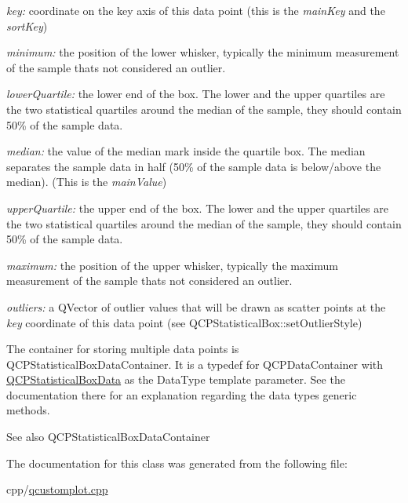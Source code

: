 \begin{DoxyItemize}
\item {\itshape key\+:} coordinate on the key axis of this data point (this is the {\itshape main\+Key} and the {\itshape sort\+Key})\end{DoxyItemize}
\begin{DoxyItemize}
\item {\itshape minimum\+:} the position of the lower whisker, typically the minimum measurement of the sample that\textquotesingle{}s not considered an outlier.\end{DoxyItemize}
\begin{DoxyItemize}
\item {\itshape lower\+Quartile\+:} the lower end of the box. The lower and the upper quartiles are the two statistical quartiles around the median of the sample, they should contain 50\% of the sample data.\end{DoxyItemize}
\begin{DoxyItemize}
\item {\itshape median\+:} the value of the median mark inside the quartile box. The median separates the sample data in half (50\% of the sample data is below/above the median). (This is the {\itshape main\+Value})\end{DoxyItemize}
\begin{DoxyItemize}
\item {\itshape upper\+Quartile\+:} the upper end of the box. The lower and the upper quartiles are the two statistical quartiles around the median of the sample, they should contain 50\% of the sample data.\end{DoxyItemize}
\begin{DoxyItemize}
\item {\itshape maximum\+:} the position of the upper whisker, typically the maximum measurement of the sample that\textquotesingle{}s not considered an outlier.\end{DoxyItemize}
\begin{DoxyItemize}
\item {\itshape outliers\+:} a Q\+Vector of outlier values that will be drawn as scatter points at the {\itshape key} coordinate of this data point (see Q\+C\+P\+Statistical\+Box\+::set\+Outlier\+Style)\end{DoxyItemize}
The container for storing multiple data points is Q\+C\+P\+Statistical\+Box\+Data\+Container. It is a typedef for Q\+C\+P\+Data\+Container with \mbox{\hyperlink{class_q_c_p_statistical_box_data}{Q\+C\+P\+Statistical\+Box\+Data}} as the Data\+Type template parameter. See the documentation there for an explanation regarding the data type\textquotesingle{}s generic methods.

\begin{DoxySeeAlso}{See also}
Q\+C\+P\+Statistical\+Box\+Data\+Container 
\end{DoxySeeAlso}


The documentation for this class was generated from the following file\+:\begin{DoxyCompactItemize}
\item 
cpp/\mbox{\hyperlink{qcustomplot_8cpp}{qcustomplot.\+cpp}}\end{DoxyCompactItemize}
